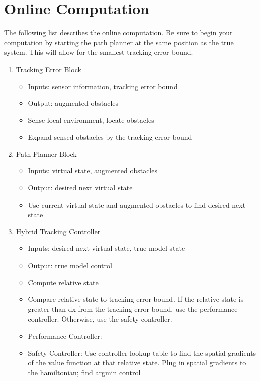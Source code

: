 \section{Online Computation \label{sec:online}}


The following list describes the online computation. Be sure to begin your computation by starting the path planner at the same position as the true system. This will allow for the smallest tracking error bound.
\begin{enumerate}
\item Tracking Error Block
\begin{itemize}
	\item Inputs: sensor information, tracking error bound
	\item Output: augmented obstacles
	\item Sense local environment, locate obstacles
	\item Expand sensed obstacles by the tracking error bound
\end{itemize}
\item Path Planner Block
\begin{itemize}
	\item Inputs: virtual  state, augmented obstacles
	\item Output: desired next virtual state
	\item Use current virtual state and augmented obstacles to find desired next state
\end{itemize}
\item Hybrid Tracking Controller
\begin{itemize}
	\item Inputs: desired next virtual state, true model state
	\item Output: true model control
	\item Compute relative state
	\item Compare relative state to tracking error bound. If the relative state is greater than dx from the tracking error bound, use the performance controller. Otherwise, use the safety controller.
	\item Performance Controller: 
	\item Safety Controller: Use controller lookup table to find the spatial gradients of the value function at that relative state. Plug in spatial gradients to the hamiltonian; find argmin control

\end{itemize}
\end{enumerate}
